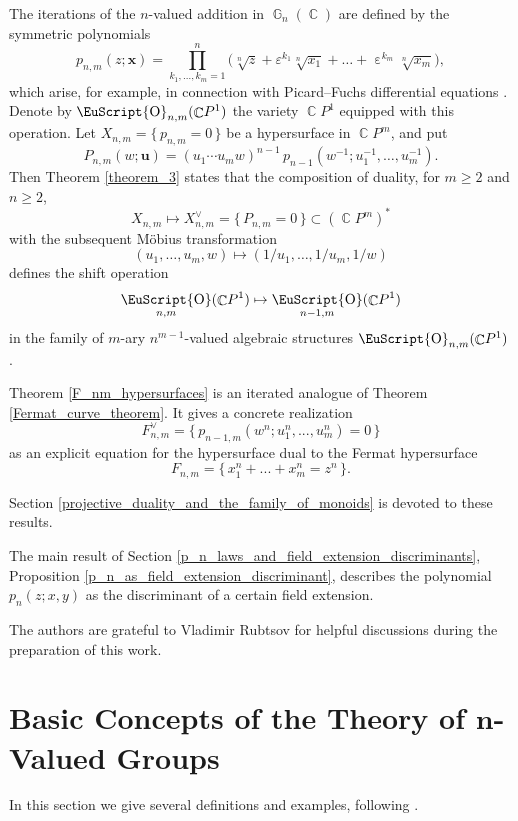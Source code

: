 \documentclass[14pt, dvipsnames]{extarticle}
\theoremstyle{plain}
\theoremstyle{definition}
\theoremstyle{remark}
\DeclareMathOperator{\G}{\mathbb{G}}
\DeclareMathOperator{\Cc}{\mathbb{C}}
\DeclareMathOperator{\Oo}{\EuScript{O}}
\DeclareMathOperator{\eps}{\varepsilon}
\begin{document}
The iterations of the $n$-valued addition in $\G_n(\Cc)$ are defined by the symmetric polynomials
\[
p_{n,m}(z;\bm{x})=\prod_{k_1,\dots,k_m=1}^{n}\bigl(\sqrt[n]{z}+\varepsilon^{k_1}\sqrt[n]{x_1}+\dots+\eps^{k_m}\sqrt[n]{x_m}\bigr),
\]
which arise, for example, in connection with Picard--Fuchs differential equations \cite[Section 3]{Gaiur}. Denote by $\Oo_{n,m}(\Cc\!P^1)$ the variety $\Cc\!P^1$ equipped with this operation. Let $X_{n,m}=\{\,p_{n,m}=0\,\}$ be a hypersurface in $\Cc\!P^m$, and put
$$P_{n,m}(w; \bm{u})=(u_1\cdots u_m w)^{n-1}\, p_{n-1}(w^{-1};u_1^{-1},\dots,u_m^{-1}).$$
Then Theorem \ref{theorem_3} states that the composition of duality, for $m\ge 2$ and $n\ge 2$,
$$X_{n,m}\mapsto X_{n,m}^{\vee}=\{\,P_{n,m}=0\,\}\subset (\Cc\!P^m)^{\ast}$$
with the subsequent Möbius transformation
$$(u_1,\dots,u_m,w)\mapsto (1/u_1,\dots,1/u_m,1/w)$$
defines the shift operation
$$\Oo_{n,m}(\Cc\!P^1)\mapsto \Oo_{n-1,m}(\Cc\!P^1)$$
in the family of $m$-ary $n^{m-1}$-valued algebraic structures $\Oo_{n,m}(\Cc\!P^1)$.

Theorem \ref{F_nm_hypersurfaces} is an iterated analogue of Theorem \ref{Fermat_curve_theorem}. It gives a concrete realization
$$F_{n,m}^{\vee} = \{\, p_{n-1, m}(w^n; u_1^n, ..., u_m^n) = 0\,\}$$
as an explicit equation for the hypersurface dual to the Fermat hypersurface
$$F_{n, m} = \{\, x_1^n + ... + x_m^n = z^n\, \}.$$

Section \ref{projective_duality_and_the_family_of_monoids} is devoted to these results.

The main result of Section \ref{p_n_laws_and_field_extension_discriminants}, Proposition \ref{p_n_as_field_extension_discriminant}, describes the polynomial $p_n(z; x, y)$ as the discriminant of a certain field extension.

The authors are grateful to Vladimir Rubtsov for helpful discussions during the preparation of this work.








\section
[Basic Concepts of the Theory of $\texorpdfstring{\boldsymbol{n}}{n}$-Valued Groups]
{Basic Concepts of the Theory of $\boldsymbol{n}$-Valued Groups}
\label{Basic_concepts_of_n_val}

In this section we give several definitions and examples, following \cite{Buchstaber}.
\end{document}
